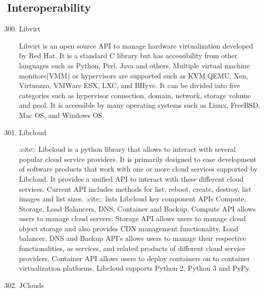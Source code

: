 \subsection{Interoperability}
\label{\detokenize{i524/technologies:interoperability}}\begin{enumerate}
\setcounter{enumi}{299}
\item {} 
Libvirt

Libvirt is an open source API to manage hardware virtualization
developed by Red Hat.  It is a standard C library but has
accessibility from other languages such as Python, Perl, Java and
others. \label{\detokenize{i524/technologies:id557}}{\hyperref[\detokenize{i524/technologies:www-libvirt}]{\sphinxcrossref{{[}477{]}}}} Multiple virtual machine
monitors(VMM) or hypervisors are supported such as KVM,QEMU, Xen,
Virtuozzo, VMWare ESX, LXC, and BHyve.  It can be divided into
five categories such as hypervisor connection, domain, network,
storage volume and pool.  \label{\detokenize{i524/technologies:id558}}{\hyperref[\detokenize{i524/technologies:www-ibm}]{\sphinxcrossref{{[}478{]}}}} It is accessible by
many operating systems such as Linux, FreeBSD, Mac OS, and
Windows OS.

\item {} 
Libcloud

:cite:: Libcloud is a python library that
allows to interact with several popular cloud service
providers. It is primarily designed to ease development of
software products that work with one or more cloud services
supported by Libcloud. It provides a unified API to interact with
these different cloud services. Current API includes methods for
list, reboot, create, destroy, list images and list
sizes. :cite:: lists Libcloud key component APIs
Compute, Storage, Load Balancers, DNS, Container and
Backup. Compute API allows users to manage cloud servers. Storage
API allows users to manage cloud object storage and also provides
CDN management functionality. Load balancer, DNS and Backup API’s
allows users to manage their respective functionalities, as
services, and related products of different cloud service
providers. Container API allows users to deploy containers on to
container virtualization platforms. Libcloud supports Python 2,
Python 3 and PyPy.

\item {} 
JClouds


\end{enumerate}
